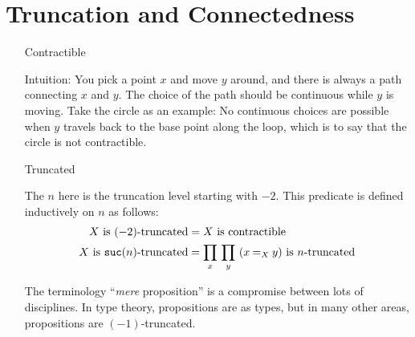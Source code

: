 \documentclass{article}
\begin{document}
\section{Truncation and Connectedness}
\begin{itemize}
  \item[Contractible]


    Intuition: You pick a point $x$ and move $y$ around, and there is always
    a path connecting $x$ and $y$. The choice of the path should be continuous
    while $y$ is moving. Take the circle as an example:
    No continuous choices are possible when $y$ travels back to the base point
    along the loop, which is to say that the circle is not contractible.

  \item[Truncated]





    The $n$ here is the truncation level starting with $-2$.
    This predicate is defined inductively on $n$ as follows:
    \begin{align*}
      \text{$X$ is $(-2)$-truncated} &= \text{$X$ is contractible}
      \\
      \text{$X$ is $\mathtt{suc}(n)$-truncated} &= \prod_x\,\prod_y\,\text{$(x \mathbin{=}_X y)$ is $n$-truncated}
    \end{align*}

    The terminology ``\emph{mere} proposition'' is a compromise between lots of
    disciplines.  In type theory, propositions are as types, but in many other areas,
    propositions are $(-1)$-truncated.


\end{itemize}
\end{document}
